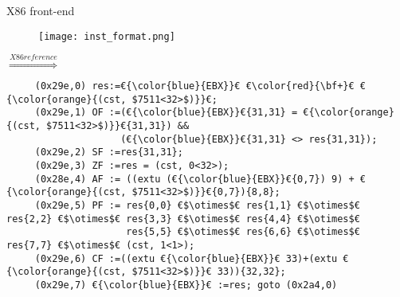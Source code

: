 \begin{frame}[fragile]{X86 front-end}
     \begin{figure}
     \texttt{[image: inst\_format.png]}
     \end{figure}
     \begin{overlayarea}{\textwidth}{0.3\textheight}
     \begin{onlyenv}\ovalbox{{\color{red}{81}} {\color{blue}{c3}} {\color{orange}{57 1d 00 00}}} $\overset{X86 reference}\Rightarrow$ 
     \end{onlyenv}
     \begin{onlyenv}
     \lstset{basicstyle=\tiny, stepnumber=10000}
     \begin{lstlisting}
     (0x29e,0) res:=€{\color{blue}{EBX}}€ €\color{red}{\bf+}€ €{\color{orange}{(cst, $7511<32>$)}}€;
     (0x29e,1) OF :=(€{\color{blue}{EBX}}€{31,31} = €{\color{orange}{(cst, $7511<32>$)}}€{31,31}) && 
                    (€{\color{blue}{EBX}}€{31,31} <> res{31,31});
     (0x29e,2) SF :=res{31,31};
     (0x29e,3) ZF :=res = (cst, 0<32>);
     (0x28e,4) AF := ((extu (€{\color{blue}{EBX}}€{0,7}) 9) + €{\color{orange}{(cst, $7511<32>$)}}€{0,7}){8,8};
     (0x29e,5) PF := res{0,0} €$\otimes$€ res{1,1} €$\otimes$€ res{2,2} €$\otimes$€ res{3,3} €$\otimes$€ res{4,4} €$\otimes$€ 
                     res{5,5} €$\otimes$€ res{6,6} €$\otimes$€ res{7,7} €$\otimes$€ (cst, 1<1>);
     (0x29e,6) CF :=((extu €{\color{blue}{EBX}}€ 33)+(extu €{\color{orange}{(cst, $7511<32>$)}}€ 33)){32,32};
     (0x29e,7) €{\color{blue}{EBX}}€ :=res; goto (0x2a4,0)
     \end{lstlisting}
     \end{onlyenv}
     \end{overlayarea}
\end{frame}



